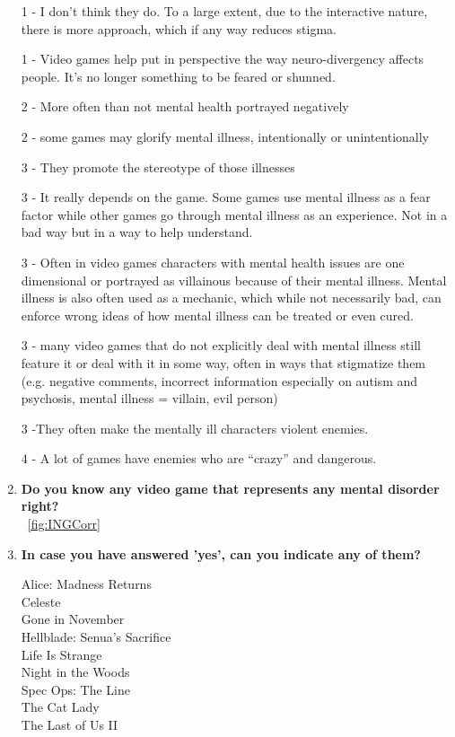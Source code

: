 \documentclass[12pt, a4paper,twoside,titlepage]{book}
\begin{document}
\begin{enumerate}[label=\textbf{\arabic*}.]
    1 - I don't think they do. To a large extent, due to the interactive nature, there is more approach, which if any way reduces stigma.
    
    
    1 - Video games help put in perspective the way neuro-divergency affects people. It’s no longer something to be feared or shunned.
    
    2 - More often than not mental health portrayed negatively
    
    2 - some games may glorify mental illness, intentionally or unintentionally
    
    3 - They promote the stereotype of those illnesses
    
    3 - It really depends on the game. Some games use mental illness as a fear factor while other games go through mental illness as an experience. Not in a bad way but in a way to help understand.
    
    3 - Often in video games characters with mental health issues are one dimensional or portrayed as villainous because of their mental illness. Mental illness is also often used as a mechanic, which while not necessarily bad, can enforce wrong ideas of how mental illness can be treated or even cured.
    
    3 - many video games that do not explicitly deal with mental illness still feature it or deal with it in some way, often in ways that stigmatize them (e.g. negative comments, incorrect information especially on autism and psychosis, mental illness = villain, evil person)
    
    3 -They often make the mentally ill characters violent enemies.
    
    4 - A lot of games have enemies who are ``crazy'' and dangerous.

     
     \item \textbf{Do you know any video game that represents any mental disorder right? }\\
    ~\ref{fig:INGCorr}
     \item \textbf{In case you have answered 'yes', can you indicate any of them?}
     
     Alice: Madness Returns \\
    Celeste\\
    Gone in November\\
    Hellblade: Senua's Sacrifice\\
    Life Is Strange\\
    Night in the Woods\\
    Spec Ops: The Line\\
    The Cat Lady\\
    The Last of Us II


\end{enumerate}
\end{document}
